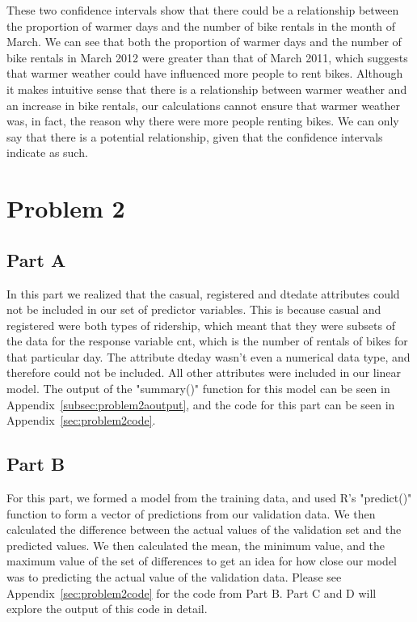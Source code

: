 \documentclass[11pt]{article}
\begin{document}
These two confidence intervals show that there could be a relationship between the proportion of warmer days and the number of bike rentals in the month of March. We can see that both the proportion of warmer days and the number of bike rentals in March 2012 were greater than that of March 2011, which suggests that warmer weather could have influenced more people to rent bikes. Although it makes intuitive sense that there is a relationship between warmer weather and an increase in bike rentals, our calculations cannot ensure that warmer weather was, in fact, the reason why there were more people renting bikes. We can only say that there is a potential relationship, given that the confidence intervals indicate as such. 
\pagebreak



\section{Problem 2}
\label{sec:problem2}
\subsection{Part A}
\label{subsec:2a}
In this part we realized that the casual, registered and dtedate attributes could not be included in our set of predictor variables. This is because casual and registered were both types of ridership, which meant that they were subsets of the data for the response variable cnt, which is the number of rentals of bikes for that particular day. The attribute dteday wasn't even a numerical data type, and therefore could not be included. All other attributes were included in our linear model. The output of the "summary()" function for this model can be seen in Appendix~\ref{subsec:problem2aoutput}, and the code for this part can be seen in Appendix~\ref{sec:problem2code}.
\subsection{Part B}
\label{subsec:2b}
For this part, we formed a model from the training data, and used R's "predict()" function to form a vector of predictions from our validation data. We then calculated the difference between the actual values of the validation set and the predicted values. We then calculated the mean, the minimum value, and the maximum value of the set of differences to get an idea for how close our model was to predicting the actual value of the validation data. Please see Appendix~\ref{sec:problem2code} for the code from Part B. Part C and D will explore the output of this code in detail.   
\end{document}
